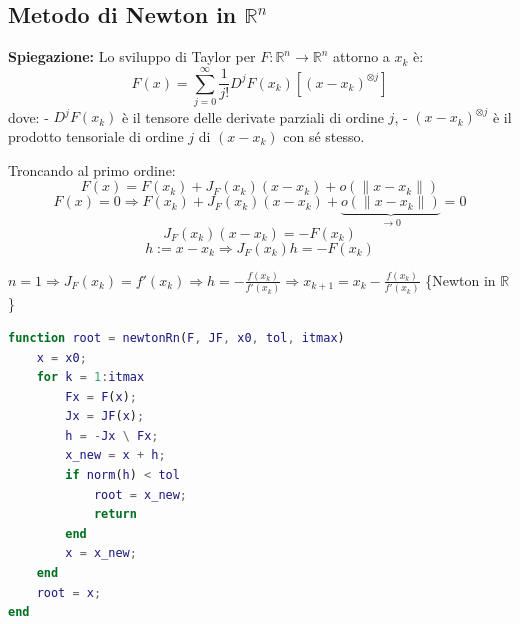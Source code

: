 \documentclass[12pt,a4paper]{article}
\begin{document}
\newpage
\subsection*{Metodo di Newton in \(\mathbb{R}^n\)}

\begin{flushleft}
\end{flushleft}

\vspace{1em}
\textbf{Spiegazione:}  
Lo sviluppo di Taylor per \(F: \mathbb{R}^n \to \mathbb{R}^n\) attorno a \(x_k\) è:
\[
F(x) = \sum_{j=0}^{\infty} \frac{1}{j!} D^jF(x_k)[(x - x_k)^{\otimes j}]
\]
dove:
- \( D^jF(x_k) \) è il tensore delle derivate parziali di ordine \(j\),
- \( (x - x_k)^{\otimes j} \) è il prodotto tensoriale di ordine \(j\) di \( (x - x_k) \) con sé stesso.

Troncando al primo ordine:
\[
F(x) = F(x_k) + J_F(x_k)(x - x_k) + o(\|x - x_k\|)
\]
\[
F(x) = 0 \Rightarrow F(x_k) + J_F(x_k)(x - x_k) + \underbrace{o(\|x - x_k\|)}_{\rightarrow 0} = 0
\]
\[
J_F(x_k)(x - x_k) = -F(x_k)
\]
\[
h := x - x_k \Rightarrow J_F(x_k)h = -F(x_k)
\]

\( n = 1 \Rightarrow J_F(x_k) = f'(x_k) \Rightarrow h = -\frac{f(x_k)}{f'(x_k)}  \Rightarrow x_{k+1} = x_k - \frac{f(x_k)}{f'(x_k)} \) \{Newton in \(\mathbb{R}\)\}

\vspace{1em}


\begin{lstlisting}[language=Matlab]
function root = newtonRn(F, JF, x0, tol, itmax)
    x = x0;
    for k = 1:itmax
        Fx = F(x);
        Jx = JF(x);
        h = -Jx \ Fx;
        x_new = x + h;
        if norm(h) < tol
            root = x_new;
            return
        end
        x = x_new;
    end
    root = x;
end
\end{lstlisting}
\end{document}
